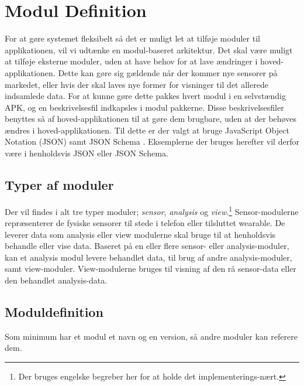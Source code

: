 \section{Modul Definition}


For at gøre systemet fleksibelt så det er muligt let at tilføje moduler til applikationen, vil vi udtænke en modul-baseret arkitektur.
Det skal være muligt at tilføje eksterne moduler, uden at have behov for at lave ændringer i hoved-applikationen.
Dette kan gøre sig gældende når der kommer nye sensorer på markedet, eller hvis der skal laves nye former for visninger til det allerede indsamlede data.
For at kunne gøre dette pakkes hvert modul i en selvstændig APK, og en beskrivelsesfil indkapsles i modul pakkerne. Disse beskrivelsesfiler benyttes så af hoved-applikationen til at gøre dem brugbare, uden at der behøves ændres i hoved-applikationen.
Til dette er der valgt at bruge JavaScript Object Notation (JSON) samt JSON Schema \cite{json_schema}.
Eksemplerne der bruges herefter vil derfor være i henholdsvis JSON eller JSON Schema.

\subsection{Typer af moduler}
Der vil findes i alt tre typer moduler; \textit{sensor}, \textit{analysis} og \textit{view}.\footnote{Der bruges engelske begreber her for at holde det implementerings-nært.}
Sensor-modulerne repræsenterer de fysiske sensorer til stede i telefon eller tilsluttet wearable.
De leverer data som analysis eller view modulerne skal bruge til at henholdsvis behandle eller vise data.
Baseret på en eller flere sensor- eller analysis-moduler, kan et analysis modul levere behandlet data, til brug af andre analysis-moduler, samt view-moduler.
View-modulerne bruges til visning af den rå sensor-data eller den behandlet analysis-data.



\subsection{Moduldefinition}
Som minimum har et modul et navn og en version, så andre moduler kan referere dem.

